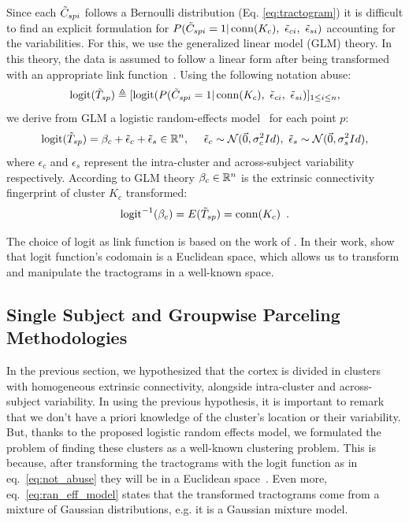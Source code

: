 Since each $\tilde C_{spi}$ follows a Bernoulli distribution (Eq. \ref{eq:tractogram})
it is difficult to find an explicit formulation for 
$P(\tilde C_{spi} = 1 | \operatorname{conn}(K_c),~\tilde \epsilon_{ci}, ~\tilde \epsilon_{si})$ 
accounting for the variabilities. For this, we use the generalized linear
model (GLM) theory. In this theory, the data is assumed to follow a linear form
after being transformed with an appropriate link function~\citep{McCullagh1989}.
Using the following notation abuse:
%
\begin{equation}
    \label{eq:not_abuse}
    \operatorname{logit}(\tilde T_{sp}) \triangleq  [\operatorname{logit}(P(\tilde C_{spi}=1 | \operatorname{conn}(K_c), ~\tilde \epsilon_{ci}, ~\tilde \epsilon_{si})]_{1  \leq i \leq n},
\end{equation}
\noindent
%
we derive from GLM a logistic random-effects model~\citep{Pendergast1996} for
each point $p$:
%
\begin{equation}
    \label{eq:ran_eff_model}
    \operatorname{logit}(\tilde T_{sp}) = \beta_{c} + \tilde \epsilon_{c} + \tilde \epsilon_{s} \in \mathbb{R}^n,
    \quad
    ~ \tilde \epsilon_{c} \sim \mathcal{N}(\vec 0, \sigma_c^2 Id),
    ~ \tilde \epsilon_{s} \sim \mathcal{N}(\vec 0, \sigma_s^2 Id),
\end{equation}
%
where $\epsilon_{c}$ and $\epsilon_{s}$ represent the intra-cluster and 
across-subject variability respectively. According to GLM theory 
$\beta_c \in \mathbb{R}^n$ is the extrinsic connectivity fingerprint of cluster $K_c$
transformed: 
%
\begin{equation}
    \operatorname{logit}^{-1}(\beta_c) = E(\tilde T_{sp}) = \operatorname{conn}(K_c) \enspace.
\end{equation}

The choice of logit as link function is based on the work of \citet{Pohl2007}.
In their work, \citet{Pohl2007} show that logit function's codomain is a
Euclidean space, which allows us to transform and manipulate the tractograms 
in a well-known space.
%
\subsection{Single Subject and Groupwise Parceling Methodologies}
\label{sec:parceling_methodologies}
%
In the previous section, we hypothesized that the cortex is divided in
clusters with homogeneous extrinsic connectivity, alongside intra-cluster and
across-subject variability. In using
the previous hypothesis, it is important to remark that we don't have a priori
knowledge of the cluster's location or their variability. But, thanks to the
proposed logistic random effects model, we formulated the problem of finding
these clusters as a well-known clustering problem. This is because, after
transforming the tractograms with the logit function as in eq.~\ref{eq:not_abuse}
they will be in a Euclidean space~\citep{Pohl2007}. Even more, eq.~\ref{eq:ran_eff_model}
states that the transformed tractograms come from a mixture of Gaussian 
distributions, e.g. it is a Gaussian mixture model.


